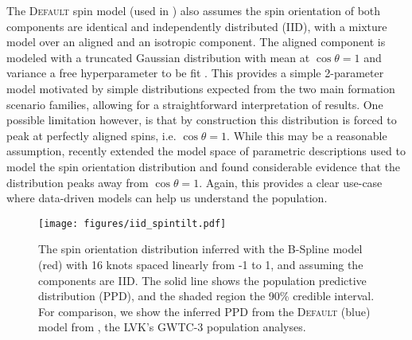 The \textsc{Default} spin model (used in \citet{o3a_pop, o3b_astro_dist}) also assumes the spin orientation of both components are identical and independently distributed (IID), with a mixture model over an
aligned and an isotropic component. The aligned component is modeled with a truncated Gaussian distribution with mean at $\cos{\theta}=1$ and variance a free 
hyperparameter to be fit \citep{Talbot_2017,Wysocki_2019,o3a_pop,o3b_astro_dist}. This provides a simple 2-parameter model motivated by simple distributions expected from the two main formation scenario families, allowing 
for a straightforward interpretation of results. One possible limitation however, is that by construction this distribution is forced to peak at perfectly aligned spins, 
i.e. $\cos{\theta}=1$. While this may be a reasonable assumption, \citet{spinitasyoulike} recently extended the model space of parametric descriptions 
used to model the spin orientation distribution and found considerable evidence that the distribution peaks away from $\cos{\theta}=1$. Again, this provides a clear 
use-case where data-driven models can help us understand the population.

\begin{figure}[ht]
    \begin{centering}
        \texttt{[image: figures/iid\_spintilt.pdf]}
        \caption{The spin orientation distribution inferred with the B-Spline model (red) with 16 knots spaced linearly from -1 to 1, and assuming the components are IID. The solid line shows the population predictive distribution (PPD), and the shaded region the 90\% credible interval. 
        For comparison, we show the inferred PPD from the \textsc{Default} (blue) model from \citet{o3b_astro_dist}, the LVK's GWTC-3 population analyses.}
        \label{fig:iid_spintilt_dist}
    \end{centering}
\end{figure}

